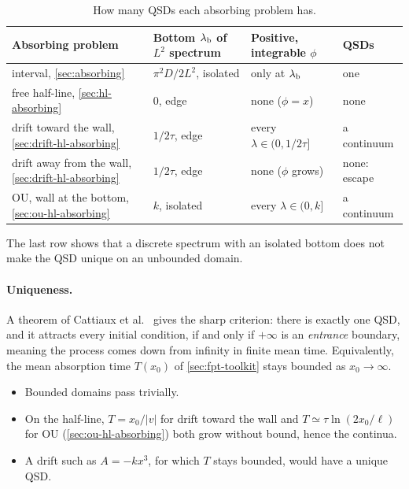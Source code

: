 \documentclass[11pt]{article}
\numberwithin{equation}{section}
\begin{document}
\begin{table}[h]
\centering
\small
\renewcommand{\arraystretch}{1.3}
\begin{tabular}{@{}l l l l@{}}
\toprule
Absorbing problem & Bottom $\lambda_{\rm b}$ of $L^2$ spectrum & Positive, integrable $\phi$ & QSDs \\
\midrule
interval, \cref{sec:absorbing}                          & $\pi^2D/2L^2$, isolated & only at $\lambda_{\rm b}$ & one \\
free half-line, \cref{sec:hl-absorbing}                 & $0$, edge               & none ($\phi=x$)           & none \\
drift toward the wall, \cref{sec:drift-hl-absorbing}    & $1/2\tau$, edge         & every $\lambda\in(0,1/2\tau]$ & a continuum \\
drift away from the wall, \cref{sec:drift-hl-absorbing} & $1/2\tau$, edge         & none ($\phi$ grows)       & none: escape \\
OU, wall at the bottom, \cref{sec:ou-hl-absorbing}      & $k$, isolated           & every $\lambda\in(0,k]$   & a continuum \\
\bottomrule
\end{tabular}
\caption{How many QSDs each absorbing problem has.}
\label{tab:spectrum-states}
\end{table}

The last row shows that a discrete spectrum with an isolated bottom does not make the QSD unique on an
unbounded domain.

\paragraph{Uniqueness.} A theorem of Cattiaux et al.~\cite{cattiaux} gives the sharp criterion: there is
exactly one QSD, and it attracts every initial condition, if and only if $+\infty$ is an \emph{entrance}
boundary, meaning the process comes down from infinity in finite mean time. Equivalently, the mean absorption
time $T(x_0)$ of \cref{sec:fpt-toolkit} stays bounded as $x_0\to\infty$.
\begin{itemize}
  \item Bounded domains pass trivially.
  \item On the half-line, $T=x_0/|v|$ for drift toward the wall and $T\simeq\tau\ln(2x_0/\ell)$ for OU
        (\cref{sec:ou-hl-absorbing}) both grow without bound, hence the continua.
  \item A drift such as $A=-kx^3$, for which $T$ stays bounded, would have a unique QSD.
\end{itemize}
\end{document}

